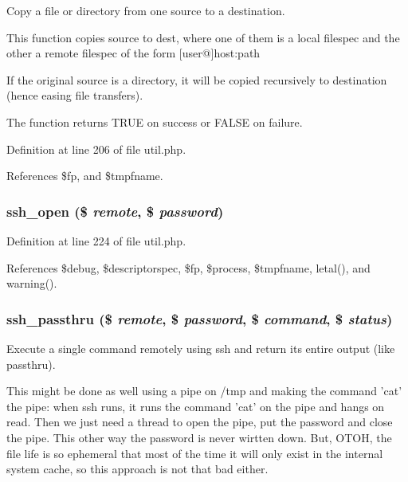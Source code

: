 Copy a file or directory from one source to a destination. 

This function copies source to dest, where one of them is a local filespec and the other a remote filespec of the form [user@]host:path

If the original source is a directory, it will be copied recursively to destination (hence easing file transfers).

The function returns TRUE on success or FALSE on failure. 

Definition at line 206 of file util.php.

References \$fp, and \$tmpfname.
\subsubsection{\setlength{\rightskip}{0pt plus 5cm}ssh\_\-open (\$ {\em remote}, \$ {\em password})}\label{util_8php_a7}




Definition at line 224 of file util.php.

References \$debug, \$descriptorspec, \$fp, \$process, \$tmpfname, letal(), and warning().
\subsubsection{\setlength{\rightskip}{0pt plus 5cm}ssh\_\-passthru (\$ {\em remote}, \$ {\em password}, \$ {\em command}, \$ {\em status})}\label{util_8php_a5}


Execute a single command remotely using ssh and return its entire output (like passthru). 

This might be done as well using a pipe on /tmp and making the command 'cat' the pipe: when ssh runs, it runs the command 'cat' on the pipe and hangs on read. Then we just need a thread to open the pipe, put the password and close the pipe. This other way the password is never wirtten down. But, OTOH, the file life is so ephemeral that most of the time it will only exist in the internal system cache, so this approach is not that bad either.

